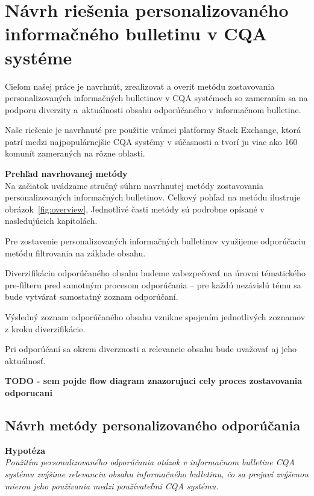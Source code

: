 \newpage
\chapter{Návrh riešenia personalizovaného informačného bulletinu v CQA systéme}

Cieľom našej práce je navrhnúť, zrealizovať a overiť metódu zostavovania personalizovaných informačných bulletinov v CQA systémoch
so zameraním sa na podporu diverzity a~aktuálnosti obsahu odporúčaného v informačnom bulletine.

Naše riešenie je navrhnuté pre použitie vrámci platformy Stack Exchange, ktorá patrí medzi najpopulárnejšie CQA systémy
v súčasnosti a tvorí ju viac ako 160 komunít zameraných na rôzne oblasti.

\textbf{Prehľad navrhovanej metódy}\\
Na začiatok uvádzame stručný súhrn navrhnutej metódy zostavovania personalizovaných informačných bulletinov.
Celkový pohľad na metódu ilustruje obrázok~\ref{fig:overview}, Jednotlivé časti metódy sú podrobne opísané v nasledujúcich kapitolách.
\begin{my_itemize}
\item{Pre zostavenie personalizovaných informačných bulletinov využijeme odporúčaciu metódu filtrovania na základe obsahu.}
\item{
    Diverzifikáciu odporúčaného obsahu budeme zabezpečovať na úrovni tématického pre-filteru pred samotným procesom
    odporúčania -- pre každú nezávislú tému sa bude vytvárať samostatný zoznam odporúčaní.
}
\item{Výsledný zoznam odporúčaného obsahu vznikne spojením jednotlivých zoznamov z kroku diverzifikácie.}
\item{Pri odporúčaní sa okrem diverznosti a relevancie obsahu bude uvažovať aj jeho aktuálnosť.}
\end{my_itemize}

\textbf{TODO - sem pojde flow diagram znazorujuci cely proces zostavovania odporucani}\label{fig:overview}

\section{Návrh metódy personalizovaného odporúčania}

\textbf{Hypotéza}\\
\textit{Použitím personalizovaného odporúčania otázok v informačnom bulletine CQA systému zvýšime relevanciu obsahu informačného
bulletinu, čo sa prejaví zvýšenou mierou jeho používania medzi používateľmi CQA systému.}

